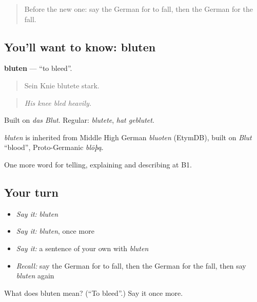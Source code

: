\label{lesson:GE-C289-bluten}



\begin{quote}
Before the new one: say the German for to fall, then the German for the fall.
\end{quote}

\subsection*{You'll want to know: bluten}
\textbf{bluten} — \textquotedblleft{}to bleed\textquotedblright{}.

\begin{quote}
Sein Knie blutete stark.
\end{quote}

\begin{quote}
\emph{His knee bled heavily.}
\end{quote}

Built on \emph{das Blut}. Regular: \emph{blutete}, \emph{hat geblutet}.

\begin{cousinweb}
\emph{bluten} is inherited from Middle High German \emph{bluoten} (EtymDB), built on \emph{Blut} \textquotedblleft{}blood\textquotedblright{}, Proto-Germanic \emph{blōþą}.
\end{cousinweb}

\begin{grammarlens}[title={What you've built}]
One more word for telling, explaining and describing at B1.
\end{grammarlens}

\subsection*{Your turn}
\begin{itemize}
\raggedright
  \item \emph{Say it:} \emph{bluten}
  \item \emph{Say it:} \emph{bluten}, once more
  \item \emph{Say it:} a sentence of your own with \emph{bluten}
  \item \emph{Recall:} say the German for to fall, then the German for the fall, then say \emph{bluten} again
\end{itemize}

\begin{tcolorbox}[breakable,colback=teal!4,colframe=teal!35!black,title={Before you move on}]
What does bluten mean? (\textquotedblleft{}To bleed\textquotedblright{}.) Say it once more.
\end{tcolorbox}
